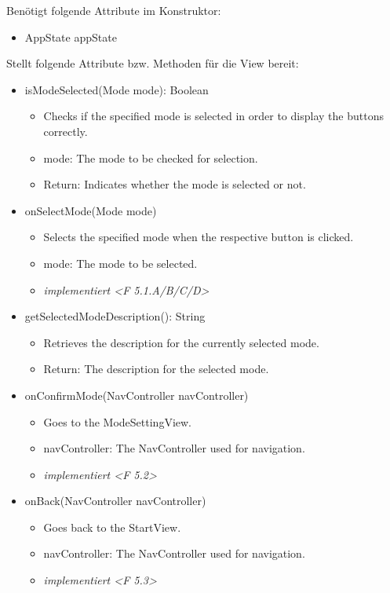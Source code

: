 \documentclass[oneside, ngerman]{sdqtechreport}
\begin{document}
Benötigt folgende Attribute im Konstruktor:
\begin{itemize}
    \item AppState appState
\end{itemize}
Stellt folgende Attribute bzw. Methoden für die View bereit:
\begin{itemize}

    \item isModeSelected(Mode mode): Boolean
    \begin{itemize}
        \item Checks if the specified mode is selected in order to display the buttons correctly.
        \item mode: The mode to be checked for selection.
        \item Return: Indicates whether the mode is selected or not.
    \end{itemize}
    \item onSelectMode(Mode mode)
        \begin{itemize}
            \item Selects the specified mode when the respective button is clicked.
            \item mode: The mode to be selected.
            \item \textit{implementiert <F 5.1.A/B/C/D>}
        \end{itemize}
    \item getSelectedModeDescription(): String
        \begin{itemize}
            \item Retrieves the description for the currently selected mode.
            \item Return: The description for the selected mode.
        \end{itemize}
    \item onConfirmMode(NavController navController)
        \begin{itemize}
            \item Goes to the ModeSettingView.
            \item navController: The NavController used for navigation.
            \item \textit{implementiert <F 5.2>}
        \end{itemize}
    \item onBack(NavController navController)
        \begin{itemize}
            \item Goes back to the StartView.
            \item navController: The NavController used for navigation.
            \item \textit{implementiert <F 5.3>}
        \end{itemize}
\end{itemize}
\end{document}
